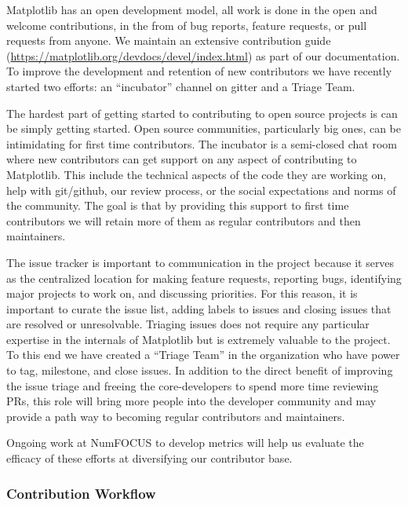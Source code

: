 \documentclass[12pt]{article}
\numberwithin{page}{section}
\begin{document}
Matplotlib has an open development model, all work is done in the open
and welcome contributions, in the from of bug reports, feature
requests, or pull requests from anyone.  We maintain an extensive
contribution guide
(\url{https://matplotlib.org/devdocs/devel/index.html}) as part of our
documentation.  To improve the development and retention of new
contributors we have recently started two efforts: an ``incubator''
channel on gitter and a Triage Team.

%

The hardest part of getting started to contributing to open source
projects is can be simply getting started.  Open source communities,
particularly big ones, can be intimidating for first time
contributors.  The incubator is a semi-closed chat room where new
contributors can get support on any aspect of contributing to
Matplotlib.  This include the technical aspects of the code they are
working on, help with git/github, our review process, or the social
expectations and norms of the community.  The goal is that by
providing this support to first time contributors we will retain more
of them as regular contributors and then maintainers.

The issue tracker is important to communication in the project because
it serves as the centralized location for making feature requests,
reporting bugs, identifying major projects to work on, and discussing
priorities.  For this reason, it is important to curate the issue
list, adding labels to issues and closing issues that are resolved or
unresolvable. Triaging issues does not require any particular
expertise in the internals of Matplotlib but is extremely valuable to
the project.  To this end we have created a ``Triage Team'' in the
organization who have power to tag, milestone, and close issues.  In
addition to the direct benefit of improving the issue triage and
freeing the core-developers to spend more time reviewing PRs, this
role will bring more people into the developer community and may
provide a path way to becoming regular contributors and maintainers.

Ongoing work at NumFOCUS to develop metrics will help us evaluate the
efficacy of these efforts at diversifying our contributor base.

\subsubsection{Contribution Workflow}
\end{document}
